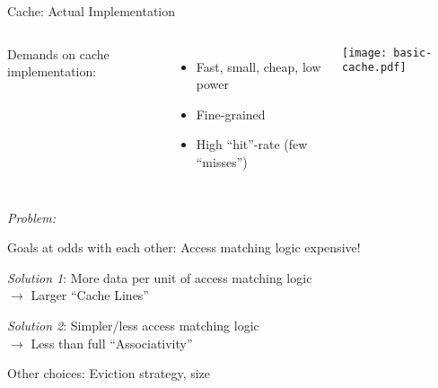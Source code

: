\documentclass[english,compress]{beamer}
\begin{document}
\begin{frame}{Cache: Actual Implementation}
  \begin{columns}
      Demands on cache implementation:
      \begin{itemize}
        \item Fast, small, cheap, low power
        \item Fine-grained
        \item High ``hit''-rate (few ``misses'')
      \end{itemize}

      \texttt{[image: basic-cache.pdf]}
  \end{columns}

  \bigskip
  \emph{Problem:}

  \colorbox{gray!20}{
  Goals at odds with each other:
  Access matching logic expensive!
  }

  \bigskip
  \emph{Solution 1}: More data per unit of access matching logic\\
  \hfill $\rightarrow$ Larger ``Cache Lines''

  \bigskip
  \emph{Solution 2}: Simpler/less access matching logic\\
  \hfill $\rightarrow$ Less than full ``Associativity''

  \bigskip
  Other choices: Eviction strategy, size
\end{frame}
\end{document}
